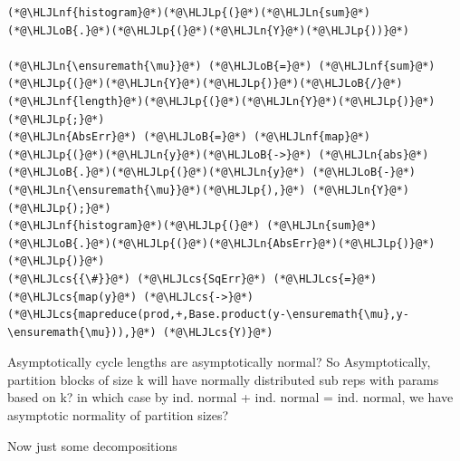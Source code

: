 \documentclass[12pt,a4paper]{article}
\newcommand{\HLJLn}[1]{#1}
\newcommand{\HLJLnf}[1]{\textcolor[RGB]{66,102,213}{#1}}
\newcommand{\HLJLoB}[1]{\textcolor[RGB]{102,102,102}{\textbf{#1}}}
\newcommand{\HLJLp}[1]{#1}
\newcommand{\HLJLcs}[1]{\textcolor[RGB]{153,153,119}{\textit{#1}}}
\begin{document}
\begin{lstlisting}
(*@\HLJLnf{histogram}@*)(*@\HLJLp{(}@*)(*@\HLJLn{sum}@*)(*@\HLJLoB{.}@*)(*@\HLJLp{(}@*)(*@\HLJLn{Y}@*)(*@\HLJLp{))}@*)

(*@\HLJLn{\ensuremath{\mu}}@*) (*@\HLJLoB{=}@*) (*@\HLJLnf{sum}@*)(*@\HLJLp{(}@*)(*@\HLJLn{Y}@*)(*@\HLJLp{)}@*)(*@\HLJLoB{/}@*) (*@\HLJLnf{length}@*)(*@\HLJLp{(}@*)(*@\HLJLn{Y}@*)(*@\HLJLp{)}@*) (*@\HLJLp{;}@*)
(*@\HLJLn{AbsErr}@*) (*@\HLJLoB{=}@*) (*@\HLJLnf{map}@*)(*@\HLJLp{(}@*)(*@\HLJLn{y}@*)(*@\HLJLoB{->}@*) (*@\HLJLn{abs}@*)(*@\HLJLoB{.}@*)(*@\HLJLp{(}@*)(*@\HLJLn{y}@*) (*@\HLJLoB{-}@*) (*@\HLJLn{\ensuremath{\mu}}@*)(*@\HLJLp{),}@*) (*@\HLJLn{Y}@*)(*@\HLJLp{);}@*)
(*@\HLJLnf{histogram}@*)(*@\HLJLp{(}@*) (*@\HLJLn{sum}@*)(*@\HLJLoB{.}@*)(*@\HLJLp{(}@*)(*@\HLJLn{AbsErr}@*)(*@\HLJLp{)}@*) (*@\HLJLp{)}@*) 
(*@\HLJLcs{{\#}}@*) (*@\HLJLcs{SqErr}@*) (*@\HLJLcs{=}@*) (*@\HLJLcs{map(y}@*) (*@\HLJLcs{->}@*) (*@\HLJLcs{mapreduce(prod,+,Base.product(y-\ensuremath{\mu},y-\ensuremath{\mu})),}@*) (*@\HLJLcs{Y)}@*)
\end{lstlisting}


Asymptotically cycle lengths are asymptotically normal? So Asymptotically, partition blocks of size k will have normally distributed sub reps with params based on k? in which case by ind. normal + ind. normal = ind. normal, we have asymptotic normality of partition sizes?


Now just some decompositions
\end{document}
